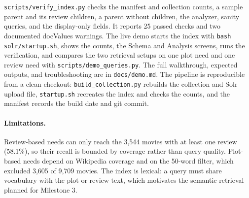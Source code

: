 \texttt{scripts/verify\_index.py} checks the manifest and collection counts, a
sample parent and its review children, a parent without children, the analyzer,
sanity queries, and the display-only fields. It reports 25 passed checks and two
documented docValues warnings. The live demo starts the index with
\texttt{bash solr/startup.sh}, shows the counts, the Schema and Analysis screens,
runs the verification, and compares the two retrieval setups on one plot need and
one review need with \texttt{scripts/demo\_queries.py}. The full walkthrough, expected
outputs, and troubleshooting are in \texttt{docs/demo.md}. The pipeline is
reproducible from a clean checkout: \texttt{build\_collection.py} rebuilds the
collection and Solr upload file, \texttt{startup.sh} recreates the index and checks
the counts, and the manifest records the build date and git commit.

\paragraph{Limitations.} Review-based needs can only reach the 3{,}544 movies with
at least one review (58.1\%), so their recall is bounded by coverage rather than
query quality. Plot-based needs depend on Wikipedia coverage and on the 50-word
filter, which excluded 3{,}605 of 9{,}709 movies. The index is lexical: a query
must share vocabulary with the plot or review text, which motivates the semantic
retrieval planned for Milestone 3.

